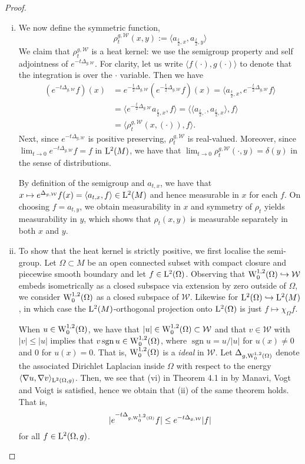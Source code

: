 \documentclass[AMS,STIX1COL]{WileyNJD-v2}
\numberwithin{equation}{section}
\renewcommand{\~}{\tilde}
\renewcommand{\-}{\bar}
\newcommand{\8}{\infty}
\newcommand{\cW}{\mathcal{W}}
\newcommand{\mdot}{\cdotp}
\newcommand{\modulus}[1]{|#1|}
\newcommand{\embed}{\hookrightarrow}		%
\newcommand{\inprod}[1]{\langle #1 \rangle}	%
\newcommand{\Lp}[2][{}]{{\rm L}^{#2}_{\rm #1}}		%
\newcommand{\Sob}[2][{}]{{\rm W}^{#2}_{\rm #1}}		%
\newcommand{\SobH}[2][{}]{{\Sob[#1]{#2,2}}}	%
\newcommand{\hk}{\rho}
\DeclareMathOperator{\sgn}{sgn}
\begin{document}
\begin{proof}
\begin{enumerate}[(i)]
\item We now define the symmetric function,
  $$\hk^{g,\cW}_t(x,y) := \inprod{a_{\frac{t}{2}, x}, a_{\frac{t}{2}, y}}$$
        We claim that \(\hk_t^{g,\cW}\) is a heat kernel: we use the semigroup property and self adjointness of \(e^{-t\Delta_{g,\cW}}\). For clarity, let us write \(\inprod{f(\cdot), g(\cdot)}\) to denote that the integration is over the \(\cdot\) variable. Then we have
	\[
        \begin{split}
        (e^{-t \Delta_{g,\cW}}f) (x) &= e^{-\frac{t}{2} \Delta_{g,\cW}} (e^{-\frac{t}{2} \Delta_{g,\cW}} f) (x) = \inprod{a_{\frac{t}{2},x}, e^{-\frac{t}{2} \Delta_{g,\cW}} f} \\
        &= \inprod{e^{-\frac{t}{2} \Delta_{g,\cW}} a_{\frac{t}{2},x}, f} = \inprod{\inprod{a_{\frac{t}{2},\cdot}, a_{\frac{t}{2},x}}, f} \\
        &= \inprod{\hk^{g,\cW}_t(x,(\cdot)), f}.
        \end{split}
        \]
        Next, since $e^{-t \Delta_{g,\cW}}$	is positive preserving, $\hk_t^{g,\cW}$ is real-valued. Moreover, since $\lim_{t\to 0} e^{-t\Delta_{g,\cW}}f = f$ in $\Lp{2}(M)$, we have that $\lim_{t \to 0} \hk^{g,\cW}_t(\mdot,y) = \delta(y)$ in the sense of distributions.

        By definition of the semigroup and $a_{t,x}$, we have that $x\mapsto e^{\Delta_{g,\cW}}f(x) = \inprod{a_{t,x},f} \in \Lp{2}(M)$
	and hence measurable in $x$ for each $f$. 
	On choosing \(f = a_{t,y}\), we obtain 
	measurability in \(x\) and symmetry of \(\rho_t\) yields measurability in \(y\),
	which shows that \(\rho_t(x, y)\) is measurable separately in both \(x\) and \(y\). 

\item To show that the heat kernel is strictly positive, we first localise the semi-group.
	Let $\Omega \subset M$ be an open connected subset with compact closure and piecewise smooth boundary  and let $f \in \Lp{2}(\Omega)$.
	Observing that $\SobH[0]{1}(\Omega) \embed \cW$ embeds isometrically as a closed subspace via extension by zero outside of $\Omega$, we consider \(\SobH[0]{1}(\Omega)\) as a closed subspace of $\cW$. Likewise for $\Lp{2}(\Omega) \embed \Lp{2}(M)$, in which case the $\Lp{2}(M)$-orthogonal projection onto $\Lp{2}(\Omega)$ is just $f \mapsto \chi_{\Omega} f$.

        When $u \in \SobH[0]{1}(\Omega)$, we have that $\modulus{u} \in \SobH[0]{1}(\Omega) \subset \cW$ and that $v \in \cW$ with $\modulus{v} \leq \modulus{u}$ implies that $v \sgn u \in \SobH[0]{1}(\Omega)$,
	where $\sgn u = u/\modulus{u}$ for $u(x) \neq 0$ and $0$ for $u(x) = 0$. That is, $\SobH[0]{1}(\Omega)$ is a \emph{ideal} in $\cW$. Let $\Delta_{g,\SobH[0]{1}(\Omega)}$ denote the associated Dirichlet Laplacian inside $\Omega$ with respect to the energy $\inprod{\nabla u, \nabla v}_{\Lp{2}(\Omega, g)}$. Then, we see that (vi) in Theorem 4.1 in \cite{MVV} by Manavi, Vogt and Voigt is satisfied, hence we obtain that (ii) of the same theorem holds. That is,
 	$$ \modulus{e^{-t\Delta_{g, \SobH[0]{1}(\Omega)}} f} \leq e^{-t \Delta_{g, \cW}} \modulus{f}$$
	for all $f \in \Lp{2}(\Omega,g)$.


\end{enumerate}
\end{proof}
\end{document}

